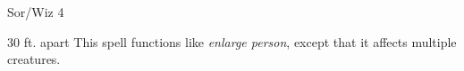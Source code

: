 
\begin{description*}
\item[Level:] Sor/Wiz 4
\end{description*}

30 ft. apart
This spell functions like \textit{enlarge person}, except that it affects multiple
creatures.